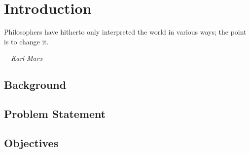 \documentclass[class=report,11pt,crop=false]{standalone}
\begin{document}
\chapter{Introduction}
\epigraph{Philosophers have hitherto only interpreted the world in various ways; the point is to change it.}%
    {\emph{---Karl Marx}}
\vspace{0.5cm}

\section{Background}




\section{Problem Statement}



\section{Objectives}
\end{document}
